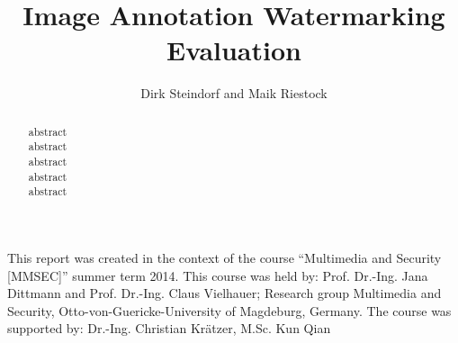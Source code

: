 \documentclass{acmtog} %
\begin{document}
\title{Image Annotation Watermarking\\ Evaluation} %

\author{Dirk Steindorf {\upshape and} Maik Riestock
}




\maketitle

\begin{bottomstuff}
This report was created in the context of the course “Multimedia and Security [MMSEC]” summer term 2014.
This course was held by: Prof. Dr.-Ing. Jana Dittmann and Prof. Dr.-Ing. Claus Vielhauer; Research group Multimedia and Security, Otto-von-Guericke-University of Magdeburg, Germany.
The course was supported by: Dr.-Ing. Christian Krätzer, M.Sc. Kun Qian
\end{bottomstuff}


\begin{abstract}
abstract\\
abstract\\
abstract\\
abstract\\
abstract\\

\end{abstract}









\appendix




\end{document}
